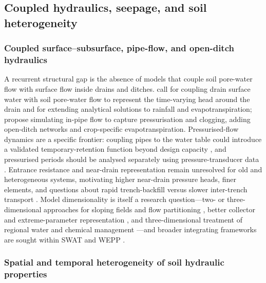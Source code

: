 \documentclass[11pt]{article}
\begin{document}
\subsection{Coupled hydraulics, seepage, and soil heterogeneity}

\subsubsection{Coupled surface--subsurface, pipe-flow, and open-ditch hydraulics}

A recurrent structural gap is the absence of models that couple soil pore-water
flow with surface flow inside drains and ditches. \textcite{Xin2016b} call for
coupling drain surface water with soil pore-water flow to represent the
time-varying head around the drain and for extending analytical solutions to
rainfall and evapotranspiration; \textcite{Nousiainen2015} propose simulating
in-pipe flow to capture pressurisation and clogging, adding open-ditch networks
and crop-specific evapotranspiration. Pressurised-flow dynamics are a specific
frontier: coupling pipes to the water table could introduce a validated
temporary-retention function beyond design capacity
\parencite{Henine2010,Henine2014}, and pressurised periods should be analysed
separately using pressure-transducer data \parencite{Saadat2018}. Entrance
resistance and near-drain representation remain unresolved for old and
heterogeneous systems, motivating higher near-drain pressure heads, finer
elements, and questions about rapid trench-backfill versus slower inter-trench
transport \parencite{Messing2006,Rimidis2003}. Model dimensionality is itself a
research question---two- or three-dimensional approaches for sloping fields and
flow partitioning \parencite{Alakukku2010,FIPPS1989}, better collector and
extreme-parameter representation \parencite{Carlier2007}, and three-dimensional
treatment of regional water and chemical management
\parencite{Mohanty1998}---and broader integrating frameworks are sought within
SWAT and WEPP \parencite{Manguerra1998,SAVABI1993,RevueltaAcosta2021}.

\subsubsection{Spatial and temporal heterogeneity of soil hydraulic properties}
\end{document}
